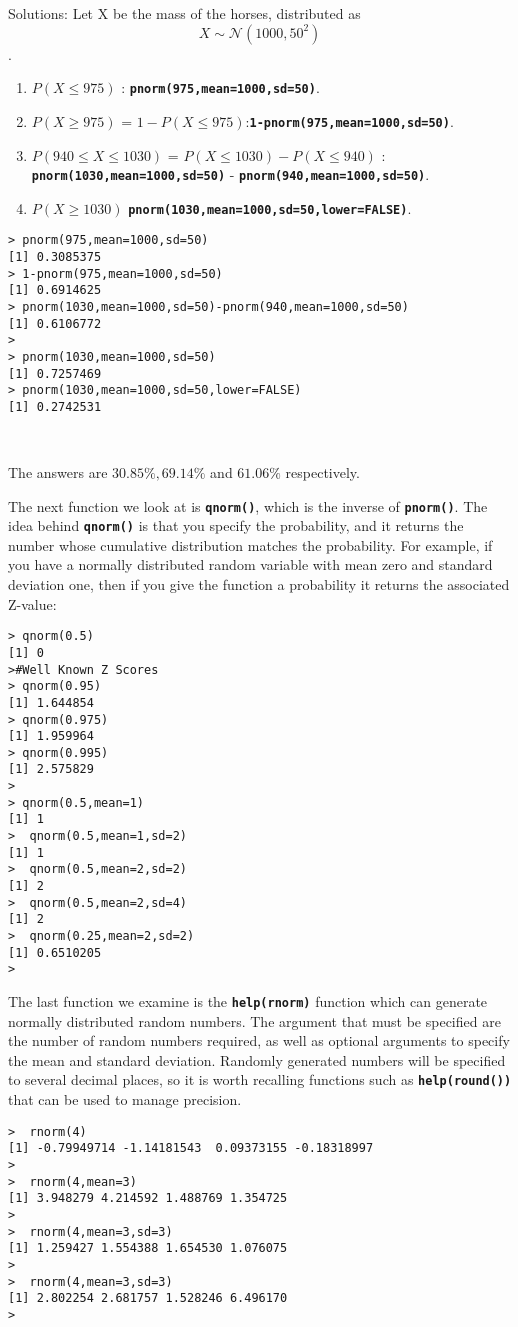 \documentclass[a4paper,12pt]{article}
\begin{document}
Solutions: Let X be the mass of the horses, distributed as
\[ X \sim \mathcal{N}(1000,50^2)\].
\begin{enumerate}
\item $P(X \leq 975)$ : \texttt{\textbf{pnorm(975,mean=1000,sd=50)}}.
\item $P(X \geq 975)$ =  $ 1- P(X \leq 975)$:\texttt{\textbf{1-pnorm(975,mean=1000,sd=50)}}. 
\item $P(940 \leq X \leq 1030)$ = $P(X \leq 1030) -  P(X \leq 940)$  : \texttt{\textbf{pnorm(1030,mean=1000,sd=50)}} - \texttt{\textbf{pnorm(940,mean=1000,sd=50)}}.     
\item $P(X \geq 1030)$       \texttt{\textbf{pnorm(1030,mean=1000,sd=50,lower=FALSE)}}.
\end{enumerate}
\begin{verbatim}
> pnorm(975,mean=1000,sd=50)
[1] 0.3085375
> 1-pnorm(975,mean=1000,sd=50)
[1] 0.6914625
> pnorm(1030,mean=1000,sd=50)-pnorm(940,mean=1000,sd=50)
[1] 0.6106772
>
> pnorm(1030,mean=1000,sd=50)
[1] 0.7257469
> pnorm(1030,mean=1000,sd=50,lower=FALSE)
[1] 0.2742531



\end{verbatim}
The answers are $30.85\%,69.14\%$ and $61.06\%$ respectively.

The next function we look at is \texttt{\textbf{qnorm()}}, which is the inverse of \texttt{\textbf{pnorm()}}. The idea behind \texttt{\textbf{qnorm()}} is that you specify the probability, and it returns the number whose cumulative distribution matches the probability. 
For example, if you have a normally distributed random variable with mean zero and standard deviation one, then if you give the function a probability it returns the associated Z-value:


\begin{verbatim}
> qnorm(0.5)
[1] 0
>#Well Known Z Scores
> qnorm(0.95)
[1] 1.644854
> qnorm(0.975)
[1] 1.959964
> qnorm(0.995)
[1] 2.575829
>
> qnorm(0.5,mean=1)
[1] 1
>  qnorm(0.5,mean=1,sd=2)
[1] 1
>  qnorm(0.5,mean=2,sd=2)
[1] 2
>  qnorm(0.5,mean=2,sd=4)
[1] 2
>  qnorm(0.25,mean=2,sd=2)
[1] 0.6510205
> 
\end{verbatim}

The last function we examine is the  \textbf{\texttt{help(rnorm)}} function which can generate normally distributed random numbers. The argument that must be specified are the number of random numbers required, as well as optional arguments to specify the mean and standard deviation. Randomly generated numbers will be specified to several decimal places, so it is worth recalling functions such as \textbf{\texttt{help(round())}} that can be used to manage precision.
\begin{verbatim}
>  rnorm(4)
[1] -0.79949714 -1.14181543  0.09373155 -0.18318997
>
>  rnorm(4,mean=3)
[1] 3.948279 4.214592 1.488769 1.354725
>
>  rnorm(4,mean=3,sd=3)
[1] 1.259427 1.554388 1.654530 1.076075
> 
>  rnorm(4,mean=3,sd=3)
[1] 2.802254 2.681757 1.528246 6.496170
> 
\end{verbatim}
\end{document}

